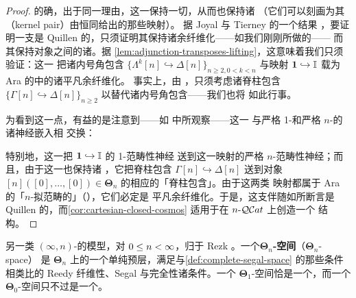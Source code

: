\begin{proof}
的确，出于同一理由，这一\trLeftAdjoint{}保持一切\trLimit，从而也保持诸%
\trMonomorphism（它们可以刻画为其\trKernelPair（kernel pair）由恒同给出的那些映射）。
据 Joyal 与 Tierney 的一个结果 \cite[7.15]{bib64}，要证明一支\trAdjunction{}是
Quillen 的，只须证明其\trLeftAdjoint{}保持诸余纤维化——如我们刚刚所做的——
而其\trRightAdjoint{}保持\trFibrant{}对象之间的诸\trFibration。据
\cref{lem:adjunction-transposes-lifting}，这意味着我们只须验证：这一%
\trLeftAdjoint{}把诸内号角包含
$\{\Lambda^{k}[n]\hookrightarrow\Delta[n]\}_{n\ge2,0<k<n}$ 与映射
$\mathbf{1}\hookrightarrow\mathbb{I}$ 载为 Ara 的\trModelStructure{}中的诸平凡余纤维化。
事实上，由 \cite[3.5]{bib64}，只须考虑诸脊柱包含
$\{\Gamma[n]\hookrightarrow\Delta[n]\}_{n\ge2}$ 以替代诸内号角包含——我们也将
如此行事。

为看到这一点，有益的是注意到——如 \cite[\S6]{bib4} 中所观察——这一%
\trLeftAdjoint{}与严格 1-\trCategory{}和严格 $n$-\trCategory{}的诸神经嵌入相
交换：
\begin{center}
\end{center}
特别地，这一\trLeftAdjoint{}把 $\mathbf{1}\hookrightarrow\mathbb{I}$ 的 1-范畴性神经
送到这一映射的严格 $n$-范畴性神经；而且，由于这一\trLeftAdjoint{}也保持诸%
\trColimit，它把脊柱包含 $\Gamma[n]\hookrightarrow\Delta[n]$ 送到对象
$[n]([0],\dots,[0])\in\boldsymbol{\Theta}_{n}$ 的相应的「脊柱包含」。由于这两类
映射都属于 Ara 的「$n$-拟范畴的\trLocalizer」（\cite[5.17]{bib4}），它们必定是
平凡余纤维化。于是，这支伴随如所断言是 Quillen 的，而\cref{cor:cartesian-closed-cosmos}%
适用于在 $n\text{-}\mathcal{Q}\mathcal{C}at$ 上创造一个\trCartesianClosed{}\trInfinityCosmos{}%
结构。
\end{proof}

另一类 $(\infty,n)$-\trCategory{}的模型，对 $0\le n<\infty$，归于 Rezk
\cite{bib101}。一个\textbf{$\boldsymbol{\Theta}_{n}$-空间}（$\boldsymbol{\Theta}_{n}$-space）
是 $\boldsymbol{\Theta}_{n}$ 上的一个单纯预层，满足与\cref{def:complete-segal-space}%
的那些条件相类比的 Reedy 纤维性、Segal 与完全性诸条件。一个
$\boldsymbol{\Theta}_{1}$-空间恰是一个\trCompleteSegalSpaces，而一个
$\boldsymbol{\Theta}_{0}$-空间只不过是一个\trKanComplex。

